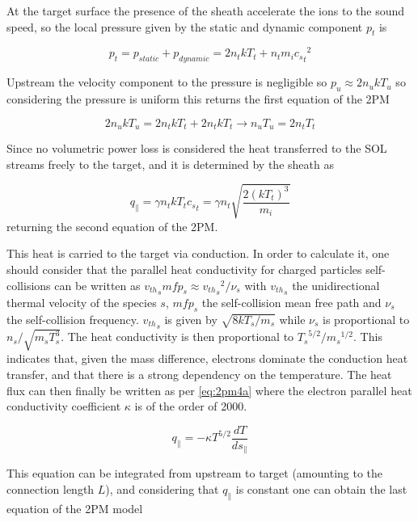 At the target surface the presence of the sheath accelerate the ions to the sound speed, so the local pressure given by the static and dynamic component $p_t$ is

\begin{equation}
p_{t} = p_{static} + p_{dynamic} = 2n_{t} k T_{t} + n_{t} m_i {{c_s}_t}^2
\label{eq:2pm1}
\end{equation}

Upstream the velocity component to the pressure is negligible so $p_u \approx 2 n_u k T_u$ so considering the pressure is uniform this returns the first equation of the 2PM

\begin{equation}
2 n_u k T_u = 2n_{t} k T_{t} + 2n_{t} k T_{t} \rightarrow n_u T_u = 2n_{t}T_{t}
\label{eq:2pm2}
\end{equation}

Since no volumetric power loss is considered the heat transferred to the SOL streams freely to the target, and it is determined by the sheath as

\begin{equation}
q_{\parallel} =  \gamma n_t k T_t {c_s}_t = \gamma n_t \sqrt{\frac{2(kT_t)^3}{m_i}}
\label{eq:2pm3}
\end{equation}
returning the second equation of the 2PM.

This heat is carried to the target via conduction. In order to calculate it, one should consider that the parallel heat conductivity for charged particles self-collisions can be written as ${v_{th}}_s mfp_s \approx {{v_{th}}_s}^2/{\nu_s}$ with ${v_{th}}_s$ the unidirectional thermal velocity of the species $s$, $mfp_s$ the self-collision mean free path and $\nu_s$ the self-collision frequency. ${v_{th}}_s$ is given by $\sqrt{8kT_s/{m_s}}$ while $\nu_s$ is proportional to $n_s/\sqrt{m_s T_s^3}$. The heat conductivity is then proportional to $ {T_s}^{5/2} / {m_s}^{1/2}$. This indicates that, given the mass difference, electrons dominate the conduction heat transfer, and that there is a strong dependency on the temperature. The heat flux can then finally be written as per \autoref{eq:2pm4a} where the electron parallel heat conductivity coefficient $\kappa$ is of the order of 2000.\cite{Stangeby2001}

\begin{equation}
q_{\parallel} = -\kappa T^{5/2} \frac{dT}{ds_{\parallel}}
\label{eq:2pm4a}
\end{equation}

This equation can be integrated from upstream to target (amounting to the connection length $L$), and considering that $q_{\parallel}$ is constant one can obtain the last equation of the 2PM model

